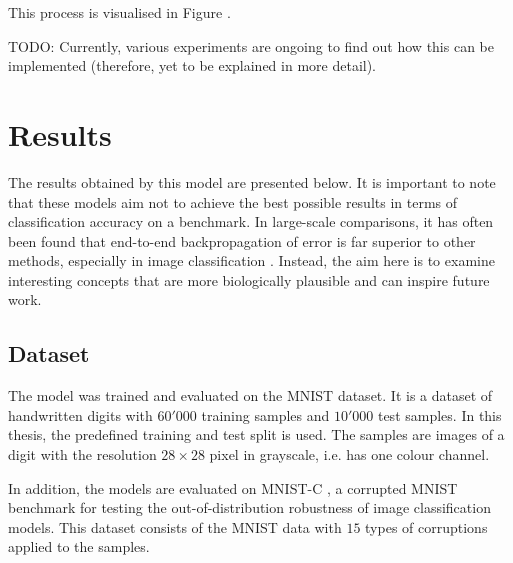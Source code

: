 This process is visualised in Figure . 


TODO: Currently, various experiments are ongoing to find out how this can be implemented (therefore, yet to be explained in more detail).




\section{Results}
The results obtained by this model are presented below. It is important to note that these models aim not to achieve the best possible results in terms of classification accuracy on a benchmark. In large-scale comparisons, it has often been found that end-to-end backpropagation of error is far superior to other methods, especially in image classification . Instead, the aim here is to examine interesting concepts that are more biologically plausible and can inspire future work.

\subsection{Dataset}
The model was trained and evaluated on the MNIST \cite{Lecun_Bottou_Bengio_Haffner_1998} dataset. It is a dataset of handwritten digits with $60'000$ training samples and $10'000$ test samples.
In this thesis, the predefined training and test split is used.
The samples are images of a digit with the resolution $28 \times 28$ pixel in grayscale, i.e. has one colour channel.

In addition, the models are evaluated on MNIST-C , a corrupted MNIST benchmark for testing the out-of-distribution robustness of image classification models. This dataset consists of the MNIST data with $15$ types of corruptions applied to the samples.

